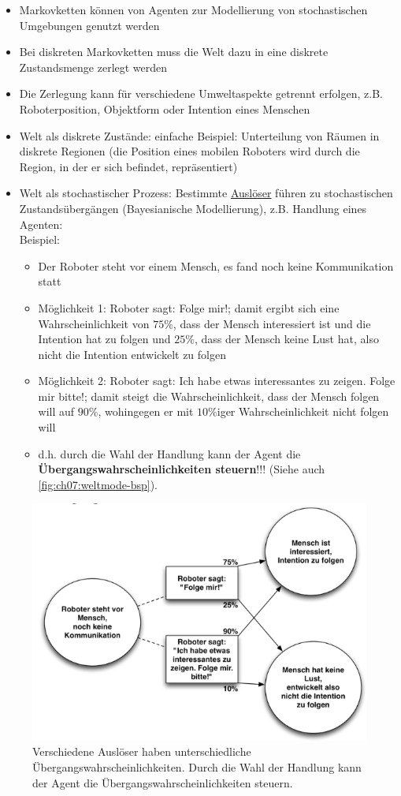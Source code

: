 \begin{itemize}
	\item Markovketten k\"onnen von Agenten zur Modellierung von stochastischen Umgebungen genutzt werden
	\item Bei diskreten Markovketten muss die Welt dazu in eine diskrete Zustandsmenge zerlegt werden
	\item Die Zerlegung kann f\"ur verschiedene Umweltaspekte getrennt erfolgen, z.B. Roboterposition, Objektform oder Intention eines Menschen
	\item Welt als diskrete Zust\"ande: einfache Beispiel: Unterteilung von R\"aumen in diskrete Regionen (die Position eines mobilen Roboters wird durch die Region, in der er sich befindet, repr\"asentiert)
	\item Welt als stochastischer Prozess: Bestimmte \underline{Ausl\"oser} f\"uhren zu stochastischen Zustands\"uberg\"angen (Bayesianische Modellierung), z.B. Handlung eines Agenten:\\ Beispiel:
	\begin{itemize}
		\item Der Roboter steht vor einem Mensch, es fand noch keine Kommunikation statt
		\item M\"oglichkeit 1: Roboter sagt: Folge mir!; damit ergibt sich eine Wahrscheinlichkeit von $75\%$, dass der Mensch interessiert ist und die Intention hat zu folgen und $25\%$, dass der Mensch keine Lust hat, also nicht die Intention entwickelt zu folgen
		\item M\"oglichkeit 2: Roboter sagt: Ich habe etwas interessantes zu zeigen. Folge mir bitte!; damit steigt die Wahrscheinlichkeit, dass der Mensch folgen will auf $90\%$, wohingegen er mit $10\%$iger Wahrscheinlichkeit nicht folgen will
		\item d.h. durch die Wahl der Handlung kann der Agent die \textbf{\"Ubergangswahrscheinlichkeiten steuern}!!! (Siehe auch \autoref{fig:ch07:weltmode-bsp}).
	\end{itemize}
\end{itemize}
\begin{figure}[!h]
	\centering
  	\includegraphics[width=0.5\linewidth]{figures/ch07_weltmode-bsp.png}
	\caption{Verschiedene Auslöser haben unterschiedliche Übergangswahrscheinlichkeiten. Durch die Wahl der Handlung kann der Agent die Übergangswahrscheinlichkeiten steuern.}
	\label{fig:ch07:weltmode-bsp}
\end{figure}
